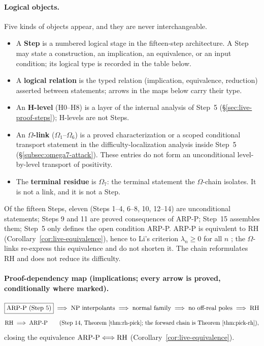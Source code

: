 \documentclass[11pt]{amsart}
\theoremstyle{definition}
\theoremstyle{remark}
\theoremstyle{definition}
\begin{document}
\paragraph{Logical objects.}  Five kinds of objects appear, and they are never interchangeable.
\begin{itemize}[leftmargin=1.8em]
\item A \textbf{Step} is a numbered logical stage in the fifteen-step architecture.  A Step may state a
construction, an implication, an equivalence, or an input condition; its logical type is recorded in the
table below.
\item A \textbf{logical relation} is the typed relation (implication, equivalence, reduction) asserted
between statements; arrows in the maps below carry their type.
\item An \textbf{H-level} (H0--H8) is a layer of the internal analysis of Step~5
(\S\ref{sec:live-proof-steps}); H-levels are not Steps.
\item An \textbf{$\Omega$-link} ($\Omega_1$--$\Omega_6$) is a proved characterization or a scoped
conditional transport statement in the difficulty-localization analysis inside Step~5
(\S\ref{subsec:omega7-attack}).  These entries do not form an unconditional level-by-level transport
of positivity.
\item The \textbf{terminal residue} is $\Omega_7$: the terminal statement the $\Omega$-chain isolates.
It is not a link, and it is not a Step.
\end{itemize}
Of the fifteen Steps, eleven (Steps 1--4, 6--8, 10, 12--14) are unconditional statements; Steps 9 and
11 are proved consequences of ARP-P; Step~15 assembles them; Step~5 only defines the open condition
ARP-P.  ARP-P is equivalent to RH (Corollary~\ref{cor:live-equivalence}), hence to Li's criterion
$\lambda_n\ge0$ for all $n$ \cite{Li}; the $\Omega$-links re-express this equivalence and do not shorten
it.  The chain reformulates RH and does not reduce its difficulty.

\paragraph{Proof-dependency map (implications; every arrow is proved, conditionally where marked).}
\[
   \boxed{\textnormal{ARP-P (Step 5)}}
   \;\Longrightarrow\;
   \textnormal{NP interpolants}
   \;\Longrightarrow\;
   \textnormal{normal family}
   \;\Longrightarrow\;
   \textnormal{no off-real poles}
   \;\Longrightarrow\;
   \textnormal{RH}
\]
\[
   \textnormal{RH}\;\Longrightarrow\;\textnormal{ARP-P}
   \qquad\text{(Step 14, Theorem~\ref{thm:rh-pick}; the forward chain is Theorem~\ref{thm:pick-rh})},
\]
closing the equivalence $\textnormal{ARP-P}\Longleftrightarrow\textnormal{RH}$
(Corollary~\ref{cor:live-equivalence}).
\end{document}
